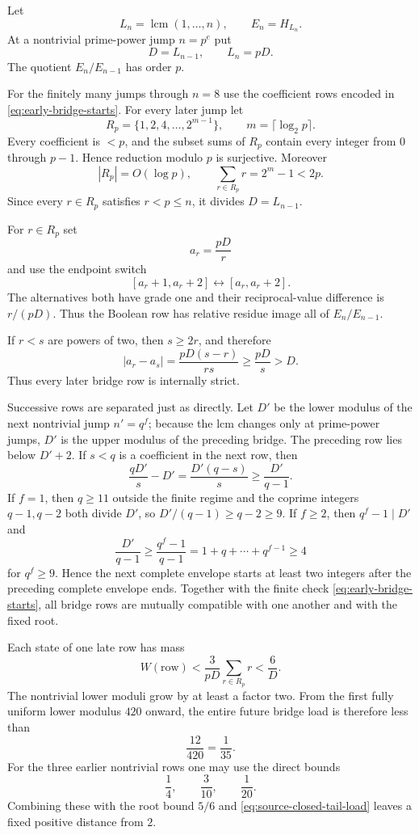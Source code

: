 Let
\[
L_n=\operatorname{lcm}(1,\ldots,n),
\qquad
E_n=H_{L_n}.
\]
At a nontrivial prime-power jump $n=p^e$ put
\[
D=L_{n-1},
\qquad L_n=pD.
\]
The quotient $E_n/E_{n-1}$ has order $p$.

For the finitely many jumps through $n=8$ use the coefficient rows encoded in
\eqref{eq:early-bridge-starts}.  For every later jump let
\[
R_p=\{1,2,4,\ldots,2^{m-1}\},
\qquad m=\lceil\log_2p\rceil.
\]
Every coefficient is $<p$, and the subset sums of $R_p$ contain every integer
from $0$ through $p-1$.  Hence reduction modulo $p$ is surjective.  Moreover
\[
|R_p|=O(\log p),
\qquad
\sum_{r\in R_p}r=2^m-1<2p.
\tag{SC4}\label{eq:binary-coefficient-row}
\]
Since every $r\in R_p$ satisfies $r<p\le n$, it divides $D=L_{n-1}$.

For $r\in R_p$ set
\[
a_r=\frac{pD}{r}
\]
and use the endpoint switch
\[
[a_r+1,a_r+2]
\longleftrightarrow
[a_r,a_r+2].
\tag{SC5}\label{eq:source-closed-bridge-switch}
\]
The alternatives both have grade one and their reciprocal-value difference is
$r/(pD)$.  Thus the Boolean row has relative residue image all of
$E_n/E_{n-1}$.

If $r<s$ are powers of two, then $s\ge2r$, and therefore
\[
|a_r-a_s|
=\frac{pD(s-r)}{rs}
\ge\frac{pD}{s}
>D.
\]
Thus every later bridge row is internally strict.

Successive rows are separated just as directly.  Let $D'$ be the lower modulus
of the next nontrivial jump $n'=q^f$; because the lcm changes only at
prime-power jumps, $D'$ is the upper modulus of the preceding bridge.  The
preceding row lies below $D'+2$.  If $s<q$ is a coefficient in the next row,
then
\[
\frac{qD'}s-D'
=\frac{D'(q-s)}s
\ge\frac{D'}{q-1}.
\]
If $f=1$, then $q\ge11$ outside the finite regime and the coprime integers
$q-1,q-2$ both divide $D'$, so $D'/(q-1)\ge q-2\ge9$.  If $f\ge2$, then
$q^f-1\mid D'$ and
\[
\frac{D'}{q-1}
\ge\frac{q^f-1}{q-1}
=1+q+\cdots+q^{f-1}\ge4
\]
for $q^f\ge9$.  Hence the next complete envelope starts at least two integers
after the preceding complete envelope ends.  Together with the finite check
\eqref{eq:early-bridge-starts}, all bridge rows are mutually compatible with
one another and with the fixed root.

Each state of one late row has mass
\[
W(\text{row})
<\frac3{pD}\sum_{r\in R_p}r
<\frac6D.
\tag{SC6}\label{eq:source-closed-row-load}
\]
The nontrivial lower moduli grow by at least a factor two.  From the first
fully uniform lower modulus $420$ onward, the entire future bridge load is
therefore less than
\[
\frac{12}{420}=\frac1{35}.
\tag{SC7}\label{eq:source-closed-tail-load}
\]
For the three earlier nontrivial rows one may use the direct bounds
\[
\frac14,\qquad \frac3{10},\qquad \frac1{20}.
\]
Combining these with the root bound $5/6$ and
\eqref{eq:source-closed-tail-load} leaves a fixed positive distance from $2$.

